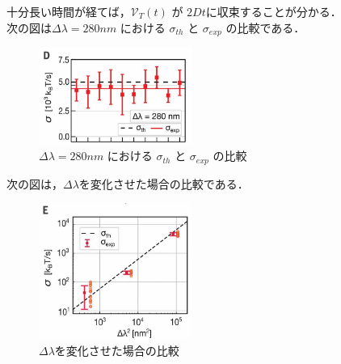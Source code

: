 \documentclass{jsarticle}
\numberwithin{equation}{section}
\theoremstyle{definition}
\begin{document}
十分長い時間が経てば，$\mathcal{V}_T (t)$ が $2Dt $に収束することが分かる．\\
\quad 次の図は$\Delta \lambda = 280 nm$ における $\sigma_{th}$ と $\sigma_{exp}$ の比較である．

\begin{figure}[H]
  \begin{center}  
  \includegraphics[width=5cm]{vsr_fig2d.png}  
  \end{center}
  \caption{$\Delta \lambda = 280 nm$ における $\sigma_{th}$ と $\sigma_{exp}$ の比較}
\end{figure}

次の図は，$\Delta \lambda $を変化させた場合の比較である．

\begin{figure}[H]
  \begin{center}  
  \includegraphics[width=5cm]{vsr_fig2e.png}  
  \end{center}
  \caption{$\Delta \lambda $を変化させた場合の比較}
\end{figure}
\end{document}
